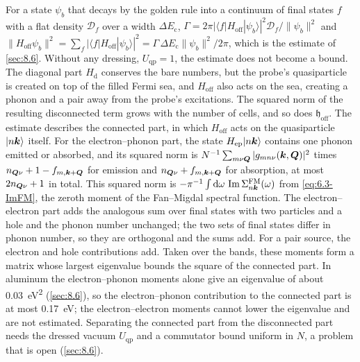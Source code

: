For a state $\psi_b$ that decays by the golden rule into a continuum of final states $f$ with a flat density $\mathcal{D}_f$ over a width $\Delta E_{\mathrm{c}}$, $\varGamma = 2\pi|\langle f|H_{\mathrm{off}}|\psi_b\rangle|^2\mathcal{D}_f/\|\psi_b\|^2$ and $\|H_{\mathrm{off}}\psi_b\|^2 = \sum_f|\langle f|H_{\mathrm{off}}|\psi_b\rangle|^2 = \varGamma\,\Delta E_{\mathrm{c}}\|\psi_b\|^2/2\pi$, which is the estimate of \cref{sec:8.6}. Without any dressing, $U_{\mathrm{qp}} = 1$, the estimate does not become a bound. The diagonal part $H_{\mathrm{d}}$ conserves the bare numbers, but the probe's quasiparticle is created on top of the filled Fermi sea, and $H_{\mathrm{off}}$ also acts on the sea, creating a phonon and a pair away from the probe's excitations. The squared norm of the resulting disconnected term grows with the number of cells, and so does $\mathfrak{h}_{\mathrm{off}}$. The estimate describes the connected part, in which $H_{\mathrm{off}}$ acts on the quasiparticle $|n\bm{k}\rangle$ itself. For the electron--phonon part, the state $H_{\mathrm{ep}}|n\bm{k}\rangle$ contains one phonon emitted or absorbed, and its squared norm is $N^{-1}\sum_{m\nu\bm{Q}}|g_{mn\nu}(\bm{k},\bm{Q})|^2$ times $n_{\bm{Q}\nu} + 1 - f_{m,\bm{k}+\bm{Q}}$ for emission and $n_{\bm{Q}\nu} + f_{m,\bm{k}+\bm{Q}}$ for absorption, at most $2n_{\bm{Q}\nu} + 1$ in total. This squared norm is $-\pi^{-1}\int\mathrm{d}\omega\,\operatorname{Im}\Sigma^{\mathrm{FM}}_{n\bm{k}}(\omega)$ from \cref{eq:6.3-ImFM}, the zeroth moment of the Fan--Migdal spectral function. The electron--electron part adds the analogous sum over final states with two particles and a hole and the phonon number unchanged; the two sets of final states differ in phonon number, so they are orthogonal and the sums add. For a pair source, the electron and hole contributions add. Taken over the bands, these moments form a matrix whose largest eigenvalue bounds the square of the connected part. In aluminum the electron--phonon moments alone give an eigenvalue of about \SI{0.03}{eV^2} (\cref{sec:8.6}), so the electron--phonon contribution to the connected part is at most \SI{0.17}{eV}; the electron--electron moments cannot lower the eigenvalue and are not estimated. Separating the connected part from the disconnected part needs the dressed vacuum $U_{\mathrm{qp}}$ and a commutator bound uniform in $N$, a problem that is open (\cref{sec:8.6}).
